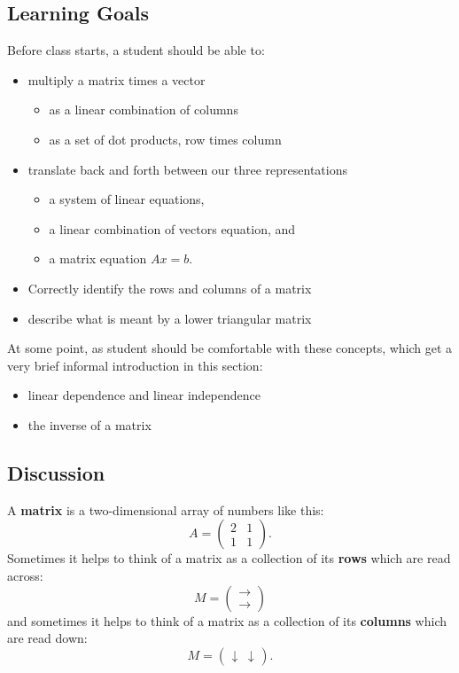 \documentclass[10pt,]{book}
\newcommand{\terminology}[1]{\textbf{#1}}
\theoremstyle{plain}
\numberwithin{equation}{section}
\begin{document}
\subsection[Learning Goals]{Learning Goals}\label{subsection-11}
Before class starts, a student should be able to:
      \begin{itemize}
\item{}multiply a matrix times a vector
          \begin{itemize}
\item{}as a linear combination of columns\item{}as a set of dot products, row times column\end{itemize}

        \item{}translate back and forth between our three representations
          \begin{itemize}
\item{}a system of linear equations,\item{}a linear combination of vectors equation, and\item{}a matrix equation \(Ax=b\).\end{itemize}

        \item{}Correctly identify the rows and columns of a matrix\item{}describe what is meant by a lower triangular matrix\end{itemize}

    At some point, as student should be comfortable with these concepts, which
    get a very brief informal introduction in this section:
    \begin{itemize}
\item{}linear dependence and linear independence\item{}the inverse of a matrix\end{itemize}

\typeout{************************************************}
\typeout{************************************************}
\subsection[Discussion]{Discussion}\label{subsection-12}

      A \terminology{matrix} is a two-dimensional array of numbers like this:\[
        A = \begin{pmatrix} 2 & 1 \\ 1 & 1 \end{pmatrix}.
      \]
      Sometimes it helps to think of a matrix as a collection of its \terminology{rows}
      which are read across:\[
        M = \begin{pmatrix} \longrightarrow \\ \longrightarrow \end{pmatrix}
      \]
      and sometimes it helps to think of a matrix as a collection of its
      \terminology{columns} which are read down:\[
        M = \begin{pmatrix} \downarrow & \downarrow \end{pmatrix}.
      \]
\par
\end{document}
